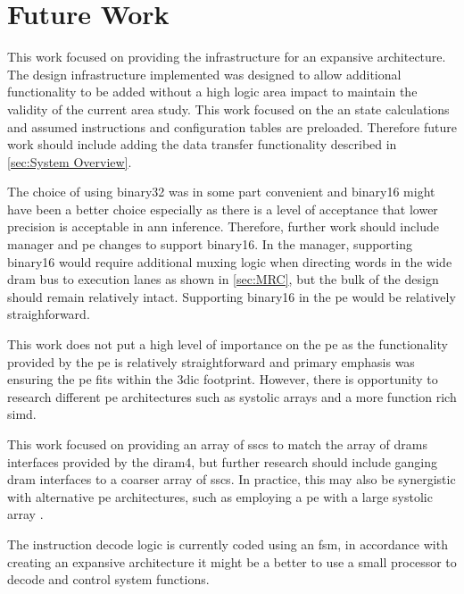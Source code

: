 \section[Future Work]{Future Work}
\label{sec:Future Work}

This work focused on providing the infrastructure for an expansive architecture.
The design infrastructure implemented was designed to allow additional functionality to be added without a high logic area impact to maintain the validity of the current area study.
This work focused on the \ac{an} state calculations and assumed instructions and configuration tables are preloaded.
Therefore future work should include adding the data transfer functionality described in \ref{sec:System Overview}.

The choice of using \ac{binary32} was in some part convenient and \ac{binary16} might have been a better choice especially as there is a level of acceptance that lower precision is acceptable in \ac{ann} inference.
Therefore, further work should include manager and \ac{pe} changes to support \ac{binary16}.
In the manager, supporting \ac{binary16} would require additional muxing logic when directing words in the wide \ac{dram} bus to execution lanes as shown in \ref{sec:MRC}, but the bulk of the design should remain relatively intact.
Supporting \ac{binary16} in the \ac{pe} would be relatively straighforward.

This work does not put a high level of importance on the \ac{pe} as the functionality provided by the \ac{pe} is relatively straightforward and primary emphasis was ensuring the \ac{pe} fits within the \ac{3dic} footprint.
However, there is opportunity to research different \ac{pe} architectures such as systolic arrays and a more function rich \ac{simd}.

This work focused on providing an array of \acp{ssc} to match the array of \acp{dram} interfaces provided by the \ac{diram4}, but further research should include ganging \ac{dram} interfaces to a coarser array of \acp{ssc}.
In practice, this may also be synergistic with alternative \ac{pe} architectures, such as employing a \ac{pe} with a large systolic array \cite{tensorflow2015-whitepaper}.

The instruction decode logic is currently coded using an \ac{fsm}, in accordance with creating an expansive architecture it might be a better to use a small processor to decode and control system functions.

